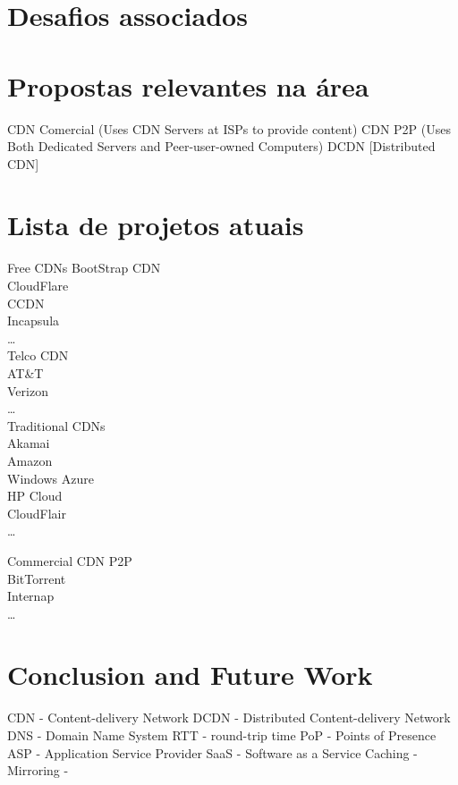 \documentclass{llncs}
\begin{document}
\section{Desafios associados}




\section{Propostas relevantes na área}
\if
	CDN Comercial (Uses CDN Servers at ISPs to provide content)
	CDN P2P (Uses Both Dedicated Servers and Peer-user-owned Computers)
	DCDN [Distributed CDN]
\fi

\section{Lista de projetos atuais}
	
	
	
	Free CDNs
		BootStrap CDN\\
		CloudFlare\\
		CCDN\\
		Incapsula\\
		\dots\\
	Telco CDN\\
		AT\&T\\
		Verizon\\
		\dots\\
	Traditional CDNs\\
		Akamai\\
		Amazon\\
		Windows Azure\\
		HP Cloud\\
		CloudFlair\\
		\dots 

	Commercial CDN P2P\\
		BitTorrent\\
		Internap\\
		\dots\\



\section{Conclusion and Future Work}




 
	CDN - Content-delivery Network
	DCDN - Distributed Content-delivery Network
	DNS - Domain Name System
	RTT - round-trip time
	PoP - Points of Presence
	ASP - Application Service Provider
	SaaS - Software as a Service
	Caching -
	Mirroring -
	
\end{document}
